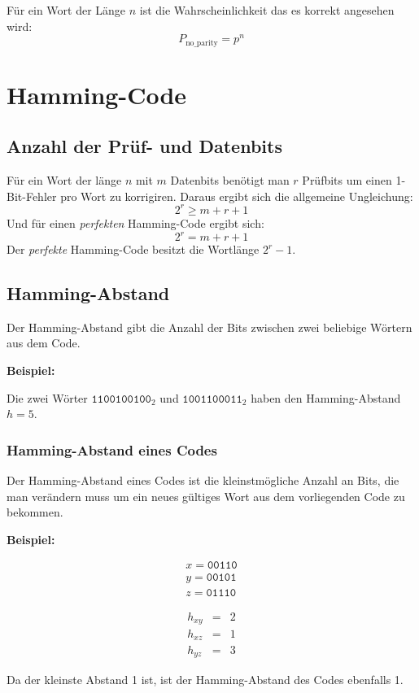 \documentclass
[
	8pt,		%
	ngerman,	%
	a4paper,	%
	landscape,	%
	final		%
]{extarticle}
\newcommand*\example{\par\vspace{\abovedisplayskip}\textbf{Beispiel:}\par}
\begin{document}
\begin{multicols*}{4}
Für ein Wort der Länge $n$ ist die Wahrscheinlichkeit das es korrekt angesehen wird:
\[P_{\text{no\_parity}} = p^{n}\]

\section{Hamming-Code}
\subsection{Anzahl der Prüf- und Datenbits}
Für ein Wort der länge $n$ mit $m$ Datenbits benötigt man $r$ Prüfbits um einen 1-Bit-Fehler
pro Wort zu korrigiren.
Daraus ergibt sich die allgemeine Ungleichung: \[2^{r} \geq m + r + 1\]
Und für einen \emph{perfekten} Hamming-Code ergibt sich: \[2^{r} = m + r + 1\]
Der \emph{perfekte} Hamming-Code besitzt die Wortlänge $2^{r} - 1$.
\subsection{Hamming-Abstand}
Der Hamming-Abstand gibt die Anzahl der Bits zwischen zwei beliebige Wörtern aus dem Code.
\example
Die zwei Wörter $\texttt{1100100100}_2$ und $\texttt{1001100011}_2$ haben den
Hamming-Abstand $h = 5$.

\subsubsection*{Hamming-Abstand eines Codes}
Der Hamming-Abstand eines Codes ist die kleinstmögliche Anzahl an Bits, die man verändern
muss um ein neues gültiges Wort aus dem vorliegenden Code zu bekommen.
\example
\begin{center}
	\begin{minipage}{.35\linewidth}
		\begin{align*}
			x = \texttt{00110} \\
			y = \texttt{00101} \\
			z = \texttt{01110}
		\end{align*}
	\end{minipage}
	\begin{minipage}{.35\linewidth}
		\begin{eqnarray*}
			h_{xy} &=& 2    \\
			h_{xz} &=& 1    \\
			h_{yz} &=& 3
		\end{eqnarray*}
	\end{minipage}
\end{center} \par
Da der kleinste Abstand 1 ist, ist der Hamming-Abstand des Codes ebenfalls 1.

\end{multicols*}
\end{document}
